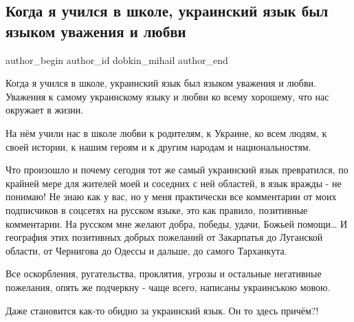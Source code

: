  
 
 
 
 
 
\subsection{Когда я учился в школе, украинский язык был языком уважения и любви}
\label{sec:19_09_2021.fb.dobkin_mihail.1.mova_uvazhenie_vrazhda}
 
\ifcmt
 author_begin
   author_id dobkin_mihail
 author_end
\fi

Когда я учился в школе, украинский язык был языком уважения и любви. Уважения к
самому украинскому языку и любви ко всему хорошему, что  нас окружает в жизни. 

На нём учили нас в школе любви к родителям, к Украине, ко всем людям, к своей
истории, к нашим героям и к другим народам и национальностям.

Что произошло и почему сегодня тот же самый украинский язык превратился, по
крайней мере для жителей моей и соседних с ней областей, в язык вражды - не
понимаю! Не знаю как у вас, но у меня практически все комментарии от моих
подписчиков в соцсетях на русском языке, это как правило, позитивные
комментарии. На русском мне желают добра, победы, удачи, Божьей помощи… И
география этих позитивных добрых пожеланий от Закарпатья до Луганской области,
от Чернигова до Одессы и дальше, до самого Тарханкута. 

Все оскорбления, ругательства, проклятия, угрозы и остальные негативные
пожелания, опять же подчеркну - чаще всего, написаны украинською мовою. 

Даже становится как-то обидно за украинский язык. Он то здесь причём?!

